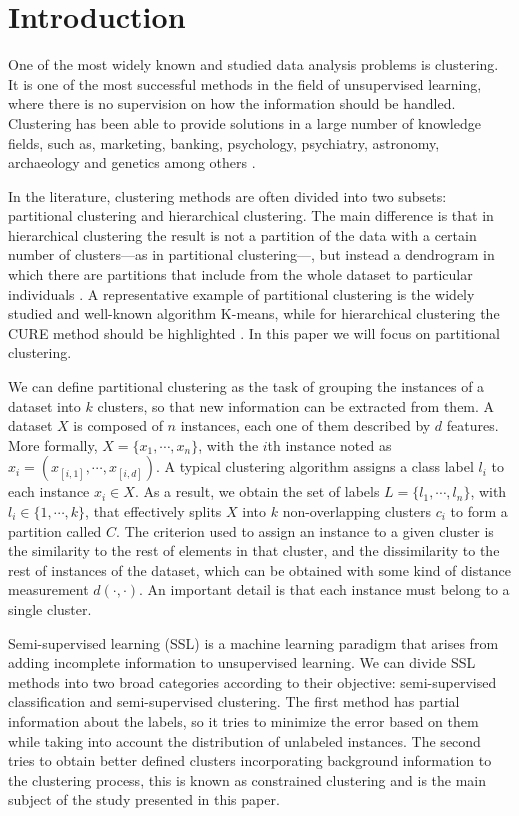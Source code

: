 \documentclass[review]{elsarticle}
\begin{document}
\section{Introduction} \label{sec:Intro}

One of the most widely known and studied data analysis problems is clustering. It is one of the most successful methods in the field of unsupervised learning, where there is no supervision on how the information should be handled. Clustering has been able to provide solutions in a large number of knowledge fields, such as, marketing, banking, psychology, psychiatry, astronomy, archaeology and genetics among others \cite{Everitt:2009:CA:1538772}.

In the literature, clustering methods are often divided into two subsets: partitional clustering and hierarchical clustering. The main difference is that in hierarchical clustering the result is not a partition of the data with a certain number of clusters---as in partitional clustering---, but instead a dendrogram in which there are partitions that include from the whole dataset to particular individuals \cite{Everitt:2009:CA:1538772}. A representative example of partitional clustering is the widely studied and well-known algorithm K-means, while for hierarchical clustering the CURE method should be highlighted \cite{wu2009top, guha1998cure}. In this paper we will focus on partitional clustering.

We can define partitional clustering as the task of grouping the instances of a dataset into $k$ clusters, so that new information can be extracted from them. A dataset $X$ is composed of $n$ instances, each one of them described by $d$ features. More formally, $X = \{x_1, \cdots, x_n\}$, with the $i$th instance noted as $x_i = (x_{[i,1]}, \cdots, x_{[i,d]})$. A typical clustering algorithm assigns a class label $l_i$ to each instance $x_i \in X$. As a result, we obtain the set of labels $L = \{l_1, \cdots, l_n\}$, with $l_i \in \{1, \cdots, k\}$, that effectively splits $X$ into $k$ non-overlapping clusters $c_i$ to form a partition called $C$. The criterion used to assign an instance to a given cluster is the similarity to the rest of elements in that cluster, and the dissimilarity to the rest of instances of the dataset, which can be obtained with some kind of distance measurement $d(\cdot, \cdot)$. An important detail is that each instance must belong to a single cluster. \cite{jain1999data}

Semi-supervised learning (SSL) is a machine learning paradigm that arises from adding incomplete information to unsupervised learning. We can divide SSL methods into two broad categories according to their objective: semi-supervised classification and semi-supervised clustering. The first method has partial information about the labels, so it tries to minimize the error based on them while taking into account the distribution of unlabeled instances. The second tries to obtain better defined clusters incorporating background information to the clustering process, this is known as constrained clustering and is the main subject of the study presented in this paper. \cite{triguero2015self}
\end{document}
